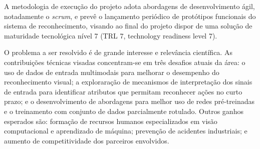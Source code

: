 A metodologia de execução do projeto adota abordagens de desenvolvimento ágil, notadamente o \emph{scrum}, e prevê o lançamento periódico de protótipos funcionais do sistema de reconhecimento, visando ao final do projeto dispor de uma solução de  maturidade tecnológica nível 7 (TRL 7, technology readiness level 7).

 O problema a ser resolvido é de grande interesse e relevância científica. As contribuições técnicas visadas concentram-se em três desafios atuais da área: o uso de dados de entrada multimodais para melhorar o desempenho do reconhecimento visual; a exploraração de mecanismos de interpretação dos sinais de entrada para identificar atributos que permitam reconhecer ações no curto prazo; e o desenvolvimento de abordagens para melhor uso de redes pré-treinadas e o treinamento com conjunto de dados parcialmente rotulado. Outros ganhos esperados são: formação de recursos humanos especializados em visão computacional e aprendizado de máquina; prevenção de acidentes industriais; e aumento de competitividade dos parceiros envolvidos.


